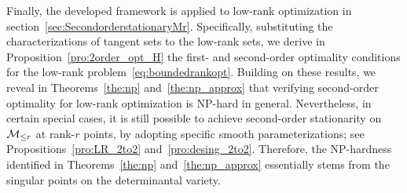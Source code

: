 Finally, the developed framework is applied to low-rank optimization in section~\ref{sec:SecondorderstationaryMr}. Specifically, substituting the characterizations of tangent sets to the low-rank sets, we derive in Proposition~\ref{pro:2order_opt_H} the first- and second-order optimality conditions for the low-rank problem~\eqref{eq:boundedrankopt}. Building on these results, we reveal in Theorems~\ref{the:np} and~\ref{the:np_approx} that verifying second-order optimality for low-rank optimization is NP-hard in general. Nevertheless, in certain special cases, it is still possible to achieve second-order stationarity on $\mathcal{M}_{\le r}$ at rank-$r$ points, by adopting specific smooth parameterizations; see Propositions~\ref{pro:LR_2to2} and~\ref{pro:desing_2to2}. Therefore, the NP-hardness identified in Theorems~\ref{the:np} and~\ref{the:np_approx} essentially stems from the singular points on the determinantal variety.

